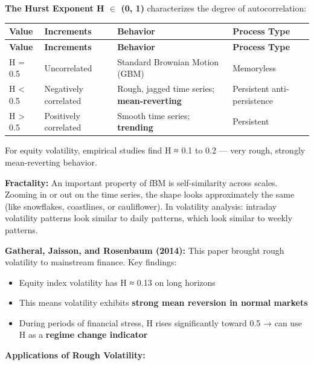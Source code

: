 \documentclass[12pt,openany]{book}
\theoremstyle{definition}
\theoremstyle{remark}
\begin{document}
\textbf{The Hurst Exponent H \(\in\) (0, 1)} characterizes the degree of autocorrelation:

\begingroup
\footnotesize
\begin{longtable}{@{}L{0.15\textwidth}L{0.25\textwidth}L{0.25\textwidth}L{0.25\textwidth}@{}}
\toprule
\textbf{Value} & \textbf{Increments} & \textbf{Behavior} & \textbf{Process Type} \\
\midrule
\endfirsthead
\toprule
\textbf{Value} & \textbf{Increments} & \textbf{Behavior} & \textbf{Process Type} \\
\midrule
\endhead
H = 0.5 & Uncorrelated & Standard Brownian Motion (GBM) & Memoryless \\
H < 0.5 & Negatively correlated & Rough, jagged time series; \textbf{mean-reverting} & Persistent anti-persistence \\
H > 0.5 & Positively correlated & Smooth time series; \textbf{trending} & Persistent \\
\bottomrule
\end{longtable}
\endgroup
For equity volatility, empirical studies find H ≈ 0.1 to 0.2 --- very rough, strongly mean-reverting behavior.

\textbf{Fractality:} An important property of fBM is self-similarity across scales. Zooming in or out on the time series, the shape looks approximately the same (like snowflakes, coastlines, or cauliflower). In volatility analysis: intraday volatility patterns look similar to daily patterns, which look similar to weekly patterns.

\textbf{Gatheral, Jaisson, and Rosenbaum (2014):} This paper brought rough volatility to mainstream finance. Key findings:

\begin{itemize}
\item Equity index volatility has H ≈ 0.13 on long horizons


\item This means volatility exhibits \textbf{strong mean reversion in normal markets}


\item During periods of financial stress, H rises significantly toward 0.5 → can use H as a \textbf{regime change indicator}


\end{itemize}
\textbf{Applications of Rough Volatility:}
\end{document}
